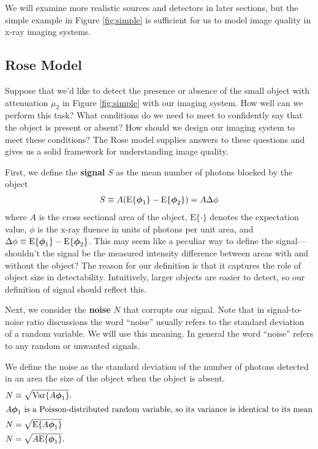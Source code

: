 \documentclass[mphy386-notes.tex]{subfiles}
\begin{document}
We will examine more realistic sources and detectors in later sections, but the
simple example in Figure \ref{fig:simple} is sufficient for us to model image
quality in x-ray imaging systems.

\subsection{Rose Model}
Suppose that we'd like to detect the presence or absence of the small object
with attenuation $\mu_2$ in Figure \ref{fig:simple} with our imaging system. How
well can we perform this task? What conditions do we need to meet to confidently
say that the object is present or absent? How should we design our imaging
system to meet these conditions? The Rose model supplies answers to these
questions and gives us a solid framework for understanding image quality.

First, we define the \textbf{signal} $S$ as the mean number of photons
blocked by the object
\begin{align}
  S \equiv A(\text{E}\{\boldsymbol{\phi}_1\} - \text{E}\{\boldsymbol{\phi}_2\}) = A\Delta\phi
\end{align}
where $A$ is the cross sectional area of the object, $\text{E}\{\cdot\}$ denotes
the expectation value, $\phi$ is the x-ray fluence in units of photons per unit
area, and $\Delta\phi \equiv \text{E}\{\boldsymbol{\phi}_1\} -
\text{E}\{\boldsymbol{\phi}_2\}$. This may seem like a peculiar way to define the
signal---shouldn't the signal be the measured intensity difference between areas
with and without the object? The reason for our definition is that it captures
the role of object size in detectability. Intuitively, larger objects are easier
to detect, so our definition of signal should reflect this.

Next, we consider the \textbf{noise} $N$ that corrupts our signal. Note that in
signal-to-noise ratio discussions the word ``noise'' usually refers to the
standard deviation of a random variable. We will use this meaning. In general
the word ``noise'' refers to any random or unwanted signals.

We define the noise as the standard deviation of the number of photons detected
in an area the size of the object when the object is absent. 
\begin{align}
  N &\equiv \sqrt{\text{Var}\{A\boldsymbol{\phi}_1\}}.\\
  \intertext{$A\boldsymbol{\phi}_1$ is a Poisson-distributed random variable, so its variance is identical to its mean}
  N &= \sqrt{\text{E}\{A\boldsymbol{\phi}_1\}}\\
  N &= \sqrt{A\text{E}\{\boldsymbol{\phi}_1\}}.
\end{align}
\end{document}
